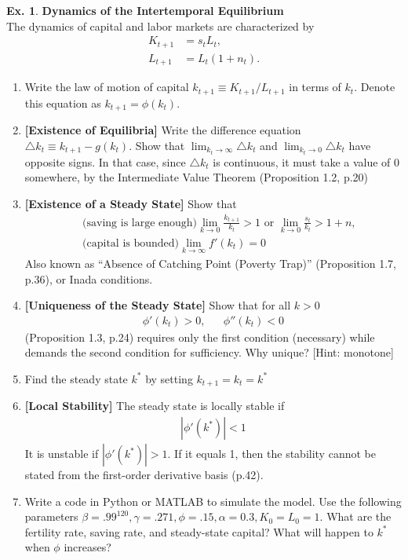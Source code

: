 \documentclass[11pt,a4paper]{book}
\theoremstyle{definition}\newtheorem{definition}{Definition}
\theoremstyle{definition}\newtheorem{fact}{Fact}
\theoremstyle{definition}\newtheorem{remark}{Remark}
\theoremstyle{definition}\newtheorem{ex}{Ex.}
\theoremstyle{definition}\newtheorem{project}{Project}
\theoremstyle{definition}\newtheorem{problem}{Problem}
\theoremstyle{definition}\newtheorem{example}{Example}
\numberwithin{theorem}{section}
\numberwithin{corollary}{chapter}
\numberwithin{assumption}{chapter}
\numberwithin{definition}{chapter}
\numberwithin{prop}{chapter}
\numberwithin{notation}{chapter}
\numberwithin{problem}{chapter}
\numberwithin{example}{chapter}
\numberwithin{fact}{chapter}
\numberwithin{ex}{chapter}
\begin{document}
\begin{ex}
		\textbf{Dynamics of the Intertemporal Equilibrium} \\
		The dynamics of capital and labor markets are characterized by
		\begin{align*}
			K_{t+1} &= s_t L_t, \\
			L_{t+1} &= L_t (1+n_t).
		\end{align*}
		\begin{enumerate}
			\item Write the law of motion of capital $k_{t+1} \equiv K_{t+1}/L_{t+1}$ in terms of $k_t$. Denote this equation as $k_{t+1} = \phi(k_t)$.
			\item \textbf{[Existence of Equilibria]} Write the difference equation $\triangle k_t \equiv k_{t+1} - g(k_t)$. Show that $\lim_{k_t\to\infty} \triangle k_t$ and $\lim_{k_t\to 0} \triangle k_t$ have opposite signs. In that case, since $\triangle k_t$ is continuous, it must take a value of 0 somewhere, by the Intermediate Value Theorem \citep{de2002theory} (Proposition 1.2, p.20)
			\item \textbf{[Existence of a Steady State]} Show that
			\begin{align*}
				& \text{ (saving is large enough)} \lim_{k\to 0} \frac{k_{t+1}}{k_t} > 1 \text{ or } \lim_{k\to 0} \frac{s_t}{k_t} > 1 + n, \\
				& \text{ (capital is bounded)} \lim_{k\to \infty} f'(k_t) = 0
			\end{align*}
			Also known as ``Absence of Catching Point (Poverty Trap)'' \citep{de2002theory} (Proposition 1.7, p.36), or Inada conditions.
			\item \textbf{[Uniqueness of the Steady State]} Show that for all $k>0$
			\begin{align*}
				\phi'(k_t) > 0, && \phi''(k_t) < 0
			\end{align*}
			\citet{de2002theory} (Proposition 1.3, p.24) requires only the first condition (necessary) while \citet{galor1989existence} demands the second condition for sufficiency. Why unique? [Hint: monotone]
			
			\item Find the steady state $k^*$ by setting $k_{t+1} = k_t = k^*$
			\item \textbf{[Local Stability]} The steady state is locally stable if
			\begin{align*}
				\left| \phi'(k^*) \right| < 1
			\end{align*}
			It is unstable if $\left| \phi'(k^*) \right| > 1$. If it equals 1, then the stability cannot be stated from the first-order derivative basis \citep{de2002theory} (p.42).
			\item Write a code in Python or MATLAB to simulate the model. Use the following parameters $\beta=.99^{120},\gamma=.271,\phi=.15,\alpha=0.3, K_0=L_0=1$. What are the fertility rate, saving rate, and steady-state capital? What will happen to $k^*$ when $\phi$ increases?
		\end{enumerate}
		

\end{ex}
\end{document}
